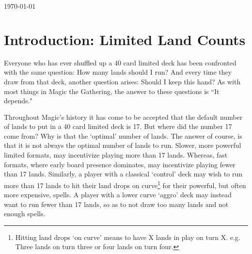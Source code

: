 \documentclass[oneside]{book}   %
\begin{document}
\begin{titlepage}
	\vfill\vfill\vfill %
	
	{\large\today} %
	
	
	 
	
	\vfill %
	
\end{titlepage}

\tableofcontents
 
\listoffigures

\listoftables
 
\mainmatter
 
\chapter{Introduction: Limited Land Counts}
\label{intro}

Everyone who has ever shuffled up a 40 card limited deck has been confronted with the same question: How many lands should I run? And every time they draw from that deck, another question arises: Should I keep this hand? As with most things in Magic the Gathering, the answer to these questions is ``It depends."

Throughout Magic's history it has come to be accepted that the default number of lands to put in a 40 card limited deck is 17. But where did the number 17 come from? Why is that the `optimal' number of lands. The answer of course, is that it is not always the optimal number of lands to run. Slower, more powerful limited formats, may incentivize playing more than 17 lands. Whereas, fast formats, where early board presence dominates, may incentivize playing fewer than 17 lands. Similarly, a player with a classical `control' deck may wish to run more than 17 lands to hit their land drops on curve\footnote{Hitting land drops `on curve' means to have X lands in play on turn X. e.g. Three lands on turn three or four lands on turn four.} for their powerful, but often more expensive, spells. A player with a lower curve `aggro' deck may instead want to run fewer than 17 lands, so as to not draw too many lands and not enough spells. 
\end{document}
